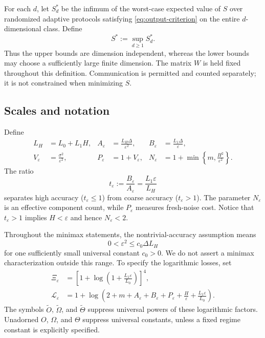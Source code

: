 \documentclass[11pt,a4paper]{article}
\newcommand{\eps}{\varepsilon}
\theoremstyle{remark}
\begin{document}
For each $d$, let $S_d^*$ be the infimum of the worst-case expected value of
$S$ over randomized adaptive protocols satisfying
\eqref{eq:output-criterion} on the entire $d$-dimensional class. Define
\begin{equation}
 S^*:=\sup_{d\ge1}S_d^*.
 \label{eq:minimax-definition}
\end{equation}
Thus the upper bounds are dimension independent, whereas the lower bounds
may choose a sufficiently large finite dimension. The matrix $W$ is held
fixed throughout this definition. Communication is permitted and counted
separately; it is not constrained when minimizing $S$.

\subsection{Scales and notation}

Define
\begin{align}
 L_H&=L_0+L_1H,&
 A_\eps&=\frac{L_H\Delta}{\eps^2},&
 B_\eps&=\frac{L_1\Delta}{\eps},
 \label{eq:abbrev}\\
 V_\eps&=\frac{\sigma^2}{\eps^2},&
 P_\eps&=1+V_\eps,&
 N_\eps&=1+\min\left\{m,\frac{H^2}{\eps^2}\right\}.
 \label{eq:refined-parameters}
\end{align}
The ratio
\begin{equation}
 t_\eps:=\frac{B_\eps}{A_\eps}=\frac{L_1\eps}{L_H}
 \label{eq:theta}
\end{equation}
separates high accuracy ($t_\eps\le1$) from coarse accuracy
($t_\eps>1$). The parameter $N_\eps$ is an effective component count, while
$P_\eps$ measures fresh-noise cost. Notice that $t_\eps>1$ implies
$H<\eps$ and hence $N_\eps<2$.

Throughout the minimax statements, the nontrivial-accuracy assumption means
\begin{equation}
 0<\eps^2\le c_0\Delta L_H
 \label{eq:nontrivial}
\end{equation}
for one sufficiently small universal constant $c_0>0$. We do not assert a
minimax characterization outside this range. To specify the logarithmic
losses, set
\begin{align}
 \Xi_\eps&=\left[1+\log\left(1+\frac{L_1\eps}{L_0}\right)\right]^4,
 \label{eq:stochastic-coarse-log}\\
 \mathcal L_\eps&=1+\log\left(2+m+A_\eps+B_\eps+P_\eps
                  +\frac H\eps+\frac{L_1\eps}{L_0}\right).
 \label{eq:global-log}
\end{align}
The symbols $\widetilde O$, $\widetilde\Omega$, and
$\widetilde\Theta$ suppress universal powers of these logarithmic factors.
Unadorned $O$, $\Omega$, and $\Theta$ suppress universal constants, unless a
fixed regime constant is explicitly specified.
\end{document}
